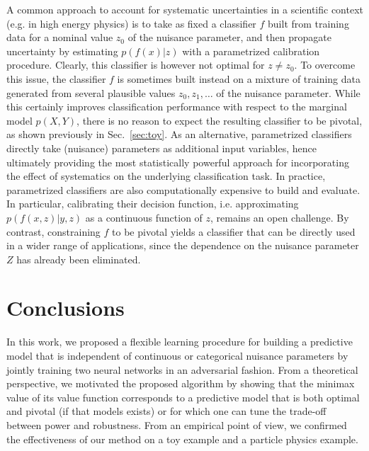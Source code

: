 \documentclass{article}
\theoremstyle{plain}
\begin{document}
A common approach to account for systematic uncertainties in
a scientific context (e.g. in high energy physics)
is to take as fixed a classifier $f$ built from training data for a nominal
value $z_0$ of the nuisance parameter, and then propagate uncertainty by
estimating $p(f(x)|z)$ with a parametrized calibration procedure. Clearly, this
classifier is however not optimal for $z \neq z_0$. To overcome this issue, the
classifier $f$ is sometimes built instead on a mixture of training data
generated from several plausible values $z_0, z_1, \dots$ of the nuisance
parameter. While this certainly improves classification performance with respect
to the marginal model $p(X,Y)$, there is no reason to expect the resulting
classifier to be pivotal, as shown previously in Sec.~\ref{sec:toy}. As an
alternative, parametrized
classifiers~\citep{cranmer2015approximating,Baldi:2016fzo} directly take
(nuisance) parameters as additional input variables, hence ultimately providing
the most statistically powerful approach for incorporating the effect of
systematics on the underlying classification task.
In practice, parametrized
classifiers  are also computationally expensive to build and evaluate. In
particular, calibrating their decision function, i.e. approximating
$p(f(x,z)|y,z)$ as a continuous function of $z$, remains an open challenge. By
contrast, constraining $f$ to be pivotal yields a classifier
that can
be directly used in a wider range of applications, since the
dependence on the nuisance parameter $Z$ has already been eliminated.



\section{Conclusions}
\label{sec:conclusions}

In this work, we proposed a flexible learning procedure for building a
predictive model that is independent of continuous or categorical nuisance
parameters by jointly training two neural networks in an adversarial fashion.
From a theoretical perspective, we motivated the proposed algorithm by showing
that the minimax value  of its value function corresponds to a predictive model
that is both optimal and pivotal (if that models exists) or for which one can
tune the trade-off between power and robustness. From an empirical point of
view, we confirmed the effectiveness of our method on a toy example
and a particle physics example.
\end{document}
